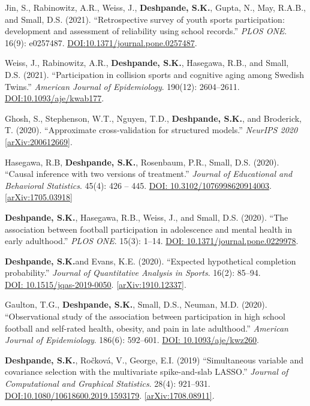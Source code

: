 \documentclass[margin]{res}
\def\skd{\textbf{Deshpande, S.K.}}
\begin{document}
\begin{resume}
Jin, S., Rabinowitz, A.R., Weiss, J., \skd, Gupta, N., May, R.A.B., and Small, D.S. (2021). ``Retrospective survey of youth sports participation: development and assessment of reliability using school records.'' \textit{PLOS ONE}. 16(9): e0257487. \href{https://doi.org/10.1371/journal.pone.0257487}{DOI:10.1371/journal.pone.0257487}.

Weiss, J., Rabinowitz, A.R., \skd, Hasegawa, R.B., and Small, D.S. (2021). ``Participation in collision sports and cognitive aging among Swedish Twins.'' \textit{American Journal of Epidemiology}. 190(12): 2604--2611. \href{https://doi.org/10.1093/aje/kwab177}{DOI:10.1093/aje/kwab177}.

Ghosh, S., Stephenson, W.T., Nguyen, T.D., \skd, and Broderick, T. (2020). ``Approximate cross-validation for structured models.'' \textit{NeurIPS 2020} \href{https://arxiv.org/abs/2006.12669}{[arXiv:200612669]}. 

Hasegawa, R.B, \skd, Rosenbaum, P.R., Small, D.S. (2020). ``Causal inference with two versions of treatment.'' \textit{Journal of Educational and Behavioral Statistics}. 45(4): 426 -- 445. \href{https://doi.org/10.3102/1076998620914003}{DOI: 10.3102/1076998620914003}. \href{https://arxiv.org/abs/1705.03918}{[arXiv:1705.03918]}

\skd, Hasegawa, R.B., Weiss, J., and Small, D.S. (2020). ``The association between football participation in adolescence and mental health in early adulthood.'' \textit{PLOS ONE}. 15(3): 1--14. \href{https://doi.org/10.1371/journal.pone.0229978}{DOI: 10.1371/journal.pone.0229978}.

\skd and Evans, K.E. (2020). ``Expected hypothetical completion probability.'' \textit{Journal of Quantitative Analysis in Sports}. 16(2): 85--94.\\ \href{https://doi.org/10.1515/jqas-2019-0050}{DOI: 10.1515/jqas-2019-0050}. \href{https://arxiv.org/abs/1910.12337}{[arXiv:1910.12337]}.

Gaulton, T.G., \skd, Small, D.S., Neuman, M.D. (2020). ``Observational study of the association between participation in high school football and self-rated health, obesity, and pain in late adulthood.'' \textit{American Journal of Epidemiology}. 186(6): 592--601. \href{https://doi.org/10.1093/aje/kwz260}{DOI: 10.1093/aje/kwz260}.

\skd, Ro\v{c}kov\'{a}, V.,  George, E.I. (2019) ``Simultaneous variable and covariance selection with the multivariate spike-and-slab LASSO.'' \textit{Journal of Computational and Graphical Statistics}. 28(4): 921--931. \href{https://doi.org/10.1080/10618600.2019.1593179}{DOI:10.1080/10618600.2019.1593179}. \href{https://arxiv.org/abs/1708.08911}{[arXiv:1708.08911]}. %


\end{resume}
\end{document}
